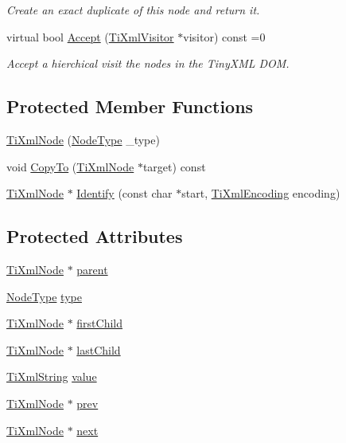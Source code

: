 \begin{DoxyCompactItemize}
\begin{DoxyCompactList}\small\item\em Create an exact duplicate of this node and return it. \end{DoxyCompactList}\item 
virtual bool \hyperlink{class_ti_xml_node_acc0f88b7462c6cb73809d410a4f5bb86}{Accept} (\hyperlink{class_ti_xml_visitor}{TiXmlVisitor} $\ast$visitor) const =0
\begin{DoxyCompactList}\small\item\em Accept a hierchical visit the nodes in the TinyXML DOM. \end{DoxyCompactList}\end{DoxyCompactItemize}
\subsection*{Protected Member Functions}
\begin{DoxyCompactItemize}
\item 
\hyperlink{class_ti_xml_node_a3f46721695868667113c7487ff123f20}{TiXmlNode} (\hyperlink{class_ti_xml_node_a836eded4920ab9e9ef28496f48cd95a2}{NodeType} \_\-type)
\item 
void \hyperlink{class_ti_xml_node_ab6056978923ad8350fb5164af32d8038}{CopyTo} (\hyperlink{class_ti_xml_node}{TiXmlNode} $\ast$target) const 
\item 
\hyperlink{class_ti_xml_node}{TiXmlNode} $\ast$ \hyperlink{class_ti_xml_node_ac1e3a8e7578be463b04617786120c2bb}{Identify} (const char $\ast$start, \hyperlink{tinyxml_8h_a88d51847a13ee0f4b4d320d03d2c4d96}{TiXmlEncoding} encoding)
\end{DoxyCompactItemize}
\subsection*{Protected Attributes}
\begin{DoxyCompactItemize}
\item 
\hyperlink{class_ti_xml_node}{TiXmlNode} $\ast$ \hyperlink{class_ti_xml_node_a662c4de61244e4fa5bd4e2d8c63143a5}{parent}
\item 
\hyperlink{class_ti_xml_node_a836eded4920ab9e9ef28496f48cd95a2}{NodeType} \hyperlink{class_ti_xml_node_a2619c6379181c16ba95ae6922e2ca839}{type}
\item 
\hyperlink{class_ti_xml_node}{TiXmlNode} $\ast$ \hyperlink{class_ti_xml_node_af749fb7f22010b80e8f904c32653d50e}{firstChild}
\item 
\hyperlink{class_ti_xml_node}{TiXmlNode} $\ast$ \hyperlink{class_ti_xml_node_a5b30756d21b304580d22a841ec9d61f8}{lastChild}
\item 
\hyperlink{class_ti_xml_string}{TiXmlString} \hyperlink{class_ti_xml_node_ab068eb0e3311ba1b5a132abe60a9c3c8}{value}
\item 
\hyperlink{class_ti_xml_node}{TiXmlNode} $\ast$ \hyperlink{class_ti_xml_node_a9c5370ea2cbfd9f0e0f7b30a57fd68f5}{prev}
\item 
\hyperlink{class_ti_xml_node}{TiXmlNode} $\ast$ \hyperlink{class_ti_xml_node_a2f329cc993d2d34df76e17dcbb776b45}{next}
\end{DoxyCompactItemize}
